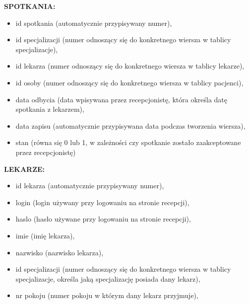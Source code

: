 \documentclass[a4paper]{article} \usepackage{polski} \usepackage[cp1250]{inputenc} \usepackage{url}
\begin{document}
 \textbf{SPOTKANIA:}
 
\begin{itemize}
\item id spotkania (automatycznie przypisywany numer),
\item id specjalizacji (numer odnoszący się do konkretnego wiersza w tablicy specjalizacje),
\item id lekarza (numer odnoszący się do konkretnego wiersza w tablicy lekarze),
\item id osoby (numer odnoszący się do konkretnego wiersza w tablicy pacjenci),
\item data odbycia (data wpisywana przez recepcjonistę, która określa datę spotkania z lekarzem),
\item data zapisu (automatycznie przypisywana data podczas tworzenia wiersza),
\item stan (równa się 0 lub 1, w zależności czy spotkanie zostało zaakceptowane przez recepcjonistę)
\end {itemize}\newline
\textbf{LEKARZE:}

\begin {itemize}
\item id lekarza (automatycznie przypisywany numer),
\item login (login używany przy logowaniu na stronie recepcji),
\item haslo (hasło używane przy logowaniu na stronie recepcji),
\item imie (imię lekarza),
\item nazwisko (nazwisko lekarza),
\item id specjalizacji (numer odnoszący się do konkretnego wiersza w tablicy specjalizacje, określa jaką specjalizację posiada dany lekarz),
\item nr pokoju (numer pokoju w którym dany lekarz przyjmuje),
 
 \end {itemize}
\end{document}
